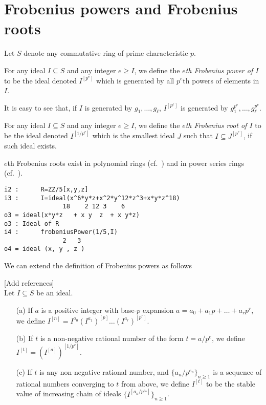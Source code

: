 \documentclass[11pt]{amsart}
\begin{document}
\section{Frobenius powers and Frobenius roots}\label{Section: Frobenius powers and Frobenius roots}


Let $S$ denote any commutative ring of prime characteristic $p$.

\begin{definition}
For any ideal $I\subseteq S$ and any integer $e\geq I$, we define the \emph{$e$th Frobenius power of $I$} to be the ideal denoted $I^{[p^e]}$ which is
generated by all $p^e$th powers of elements in $I$.
\end{definition}

It is easy to see that, if $I$ is generated by $g_1, \dots, g_\ell$, $I^{[p^e]}$ is generated by $g_1^{p^e}, \dots, g_\ell^{p^e}$.


\begin{definition}
For any ideal $I\subseteq S$ and any integer $e\geq I$, we define the \emph{$e$th Frobenius root of $I$} to be the ideal denoted $I^{[1/p^{e}]}$ which is
the smallest ideal $J$ such that $I\subseteq J^{[p^e]}$, if such ideal exists.
\end{definition}

$e$th Frobenius roots exist in polynomial rings (cf.~\cite[\S 2]{BlickleMustataSmithDiscretenessAndRationalityOfFThresholds}) and in power series rings
(cf.~\cite[\S 5]{KatzmanParameterTestIdealOfCMRings}).


\begin{verbatim}
i2 :      R=ZZ/5[x,y,z]
i3 :      I=ideal(x^6*y*z+x^2*y^12*z^3+x*y*z^18)
                18    2 12 3    6
o3 = ideal(x*y*z   + x y  z  + x y*z)
o3 : Ideal of R
i4 :      frobeniusPower(1/5,I)
                2   3
o4 = ideal (x, y , z )
\end{verbatim}

We can extend the definition of Frobenius powers as follows
\begin{definition}{\hfill\large\color{red} [Add references]}\\
Let  $I\subseteq S$ be an ideal.
\begin{enumerate}
 \item[(a)] If $a$ is a positive integer with base-$p$ expansion  $a=a_0 + a_1 p +  \dots + a_r p^r$, we define
 $I^{[n]}=I^{a_0} \left(I^{a_1}\right)^{[p]} \dots  (I^{a_r})^{[p^r]}$. %
 \item[(b)] If $t$ is a non-negative rational number of the form $t = a/p^e$, we define  $I^{[t]} = (I^{[a]})^{[1/p^e]}.$
 \item[(c)] If $t$ is any non-negative rational number, and $\{a_n/p^{e_n}\}_{n\geq 1}$ is a sequence of rational numbers converging to $t$ from above, we define $I^{[t]}$
 to be the stable value of increasing chain of ideals $\{I^{[a_n/p^{e_n}]}\}_{n\geq 1}$.

\end{enumerate}
\end{definition}
\end{document}
